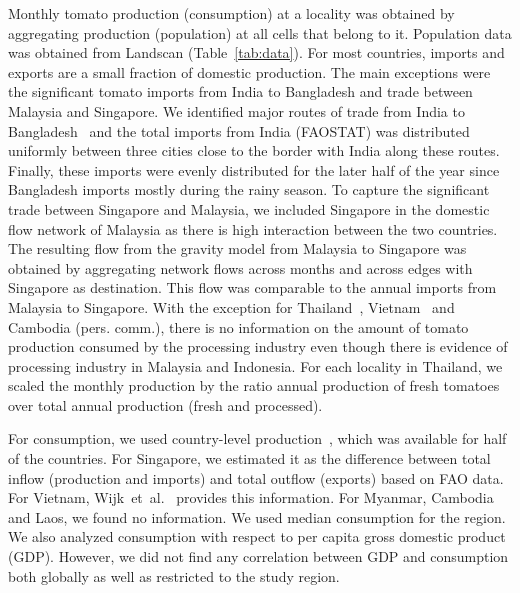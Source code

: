 \documentclass[10pt]{article}
\theoremstyle{definition}
\begin{document}
Monthly tomato production (consumption) at a locality was obtained by aggregating
production (population) at all cells that belong to it. Population data was
obtained from Landscan (Table~\ref{tab:data}).
For most countries, imports and exports are a small fraction of domestic
production. The main
exceptions were the significant tomato imports from India to Bangladesh and
trade between Malaysia and Singapore. We identified major routes of trade
from India to Bangladesh~\cite{EIIndia2015} and the total imports from
India (FAOSTAT) was distributed uniformly between three cities close to the
border with India along these routes. Finally, these imports were evenly
distributed for the later half of the year since Bangladesh imports mostly
during the rainy season. To capture the significant trade between Singapore
and Malaysia, we included Singapore in the domestic flow network of
Malaysia as there is high interaction between the two countries.  The
resulting flow from the gravity model from Malaysia to Singapore was
obtained by aggregating network flows across months and across edges with
Singapore as destination. This flow was comparable to the annual imports
from Malaysia to Singapore. With the exception for
Thailand~\cite{mict2013}, Vietnam~\cite{wijk2007} and Cambodia (pers.
comm.), there is no information on the amount of tomato production consumed
by the processing industry even though there is evidence of processing
industry in Malaysia and Indonesia. For each locality in Thailand, we
scaled the monthly production by the ratio annual production of fresh
tomatoes over total annual production (fresh and processed).

For consumption, we used
country-level production~\cite{consumption}, which was available for half
of the countries. For Singapore, we estimated it as the difference between
total inflow (production and imports) and total outflow (exports) based on
FAO data. For Vietnam, Wijk~et~al.~\cite{wijk2007} provides this
information. For Myanmar, Cambodia and Laos, we found no information. We
used median consumption for the region. We also analyzed consumption with
respect to per capita gross domestic product (GDP). However, we did not
find any correlation between GDP and consumption both globally as well as
restricted to the study region. 
\end{document}
